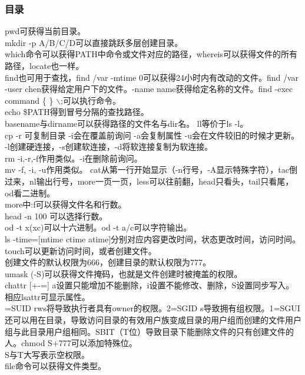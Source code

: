\documentclass{ctexart}
\begin{document}
\subsubsection*{目录}
\noindent pwd可获得当前目录。\\
\noindent [deprecated] mkdir -p A/B/C/D可以直接跳跃多层创建目录。\\
\noindent which命令可以获得PATH中命令或文件对应的路径，whereis可以获得文件的所有路径，locate也一样。\\
\noindent find也可用于查找，find /var -mtime 0可以获得24小时内有改动的文件。find /var -user chen获得给定用户下的文件。-name name获得给定名称的文件。find -exec command \{ \} $\backslash$;可以执行命令。\\
\noindent echo \$PATH得到冒号分隔的查找路径。\\
\noindent basename与dirname可以获得路径的文件名与dir名。
\noindent ll等价于ls -l。\\
\noindent cp -r 可复制目录 -i会在覆盖前询问 -a会复制属性 -u会在文件较旧的时候才更新。 -l创建硬连接，-s创建软连接，-d将软连接复制为软连接。\\
\noindent rm -i,-r,-f作用类似。-i在删除前询问。\\
\noindent mv -f, -i, -u作用类似。
\noindent cat从第一行开始显示（-n行号，-A显示特殊字符），tac倒过来，nl输出行号，more一页一页，less可以往前翻，head只看头，tail只看尾，od看二进制。\\
\noindent more中:f可以获得文件名和行数。\\
\noindent head -n 100 可以选择行数。\\
\noindent od -t x(xc)可以十六进制。od -t a/c可以字符输出。\\
\noindent ls -time=[mtime ctime atime]分别对应内容更改时间，状态更改时间，访问时间。touch可以更新访问时间，或者创建文件。\\
\noindent 创建文件的默认权限为666，创建目录的默认权限为777。\\
\noindent umask (-S)可以获得文件掩码，也就是文件创建时被掩盖的权限。\\
\noindent chattr [+-=] a设置只能增加不能删除，i设置不能修改、删除，S设置同步写入。相应lsattr可显示属性。\\
=SUID rws将导致执行者具有owner的权限。2=SGID s导致拥有组权限。1=SGUI还可以用在目录，导致访问目录的有效用户族变成目录的用户组而创建的文件用户组与此目录用户组相同。SBIT（T位）导致目录下能删除文件的只有创建文件的人。chmod S+777可以添加特殊位。\\
\noindent S与T大写表示空权限。\\
\noindent file命令可以获得文件类型。 \\
\end{document}
